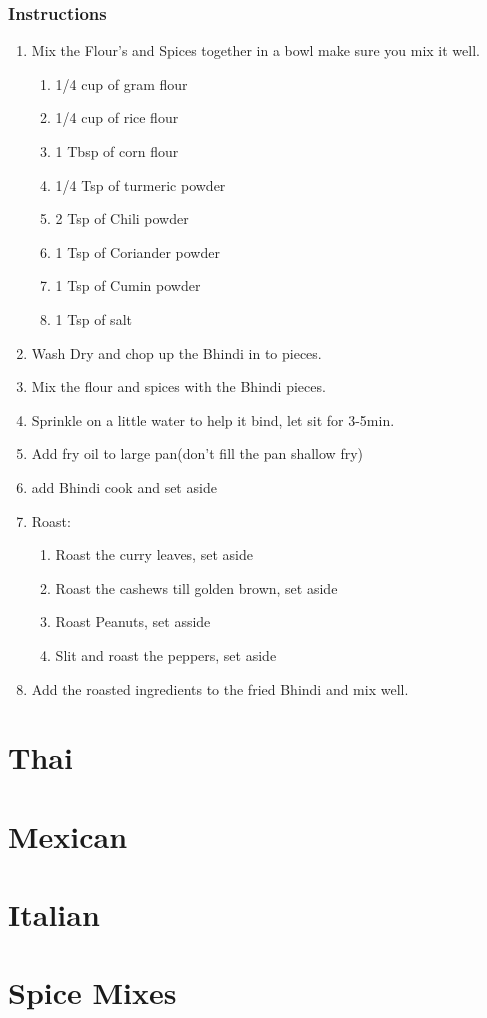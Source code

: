 \documentclass[11pt]{article}
\begin{document}
\subsubsection*{Instructions}
\label{sec:org475ba0d}
\begin{enumerate}
\item Mix the Flour's and Spices together in a bowl make sure you mix it well.
\begin{enumerate}
\item 1/4 cup of gram flour
\item 1/4 cup of rice flour
\item 1 Tbsp of corn flour
\item 1/4 Tsp of turmeric powder
\item 2 Tsp of Chili powder
\item 1 Tsp of Coriander powder
\item 1 Tsp of Cumin powder
\item 1 Tsp of salt
\end{enumerate}
\item Wash Dry and chop up the Bhindi in to pieces.
\item Mix the flour and spices with the Bhindi pieces.
\item Sprinkle on a little water to help it bind, let sit for 3-5min.
\item Add fry oil to large pan(don't fill the pan shallow fry)
\item add Bhindi cook and set aside
\item Roast:
\begin{enumerate}
\item Roast the curry leaves, set aside
\item Roast the cashews till golden brown, set aside
\item Roast Peanuts, set asside
\item Slit and roast the peppers, set aside
\end{enumerate}
\item Add the roasted ingredients to the fried Bhindi and mix well.
\end{enumerate}
\section{Thai}
\label{sec:org01fc4cd}
\section{Mexican}
\label{sec:orgef3862d}
\section{Italian}
\label{sec:org8711240}
\section{Spice Mixes}
\label{sec:org7cdd8af}
\end{document}
